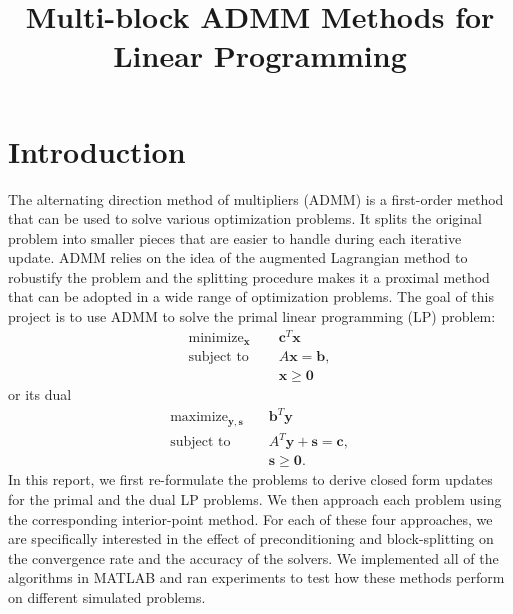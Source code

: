 \documentclass{article}
\title{Multi-block ADMM Methods for Linear Programming }
\author{\studentname}
\begin{document}
\maketitle
\vspace{0.1in}
\maketitle



\section{Introduction}
The alternating direction method of multipliers (ADMM) is a first-order method that can be used to solve various optimization problems. It splits the original problem into smaller pieces that are easier to handle during each iterative update. ADMM relies on the idea of the augmented Lagrangian method to robustify the problem and the splitting procedure makes it a proximal method that can be adopted in a wide range of optimization problems.
\newline
\newline
The goal of this project is to use ADMM to solve the primal linear programming  (LP) problem:
\begin{align}
\text{minimize}_{\mathbf{x}} &\quad \mathbf{c}^T\mathbf{x} \tag{OPT1}\label{OPT1} \\
\text{subject to } &\quad  A \mathbf{x} = \mathbf{b},  \nonumber \\
&\quad \mathbf{x} \geq \mathbf{0} \nonumber 
\end{align}
or its dual
\begin{align}
\text{maximize}_{\mathbf{y}, \mathbf{s}} &\quad \mathbf{b}^T\mathbf{y}  \tag{OPT2}\label{OPT2} \\
\text{subject to } &\quad  A^T \mathbf{y}  + \mathbf{s} = \mathbf{c},  \nonumber \\
&\quad \mathbf{s} \geq \mathbf{0} \nonumber.
\end{align}
In this report, we first re-formulate the problems to derive closed form updates for the primal and the dual LP problems. We then approach each problem using the corresponding interior-point method. For each of these four approaches, we are specifically interested in the effect of preconditioning and block-splitting on the convergence rate and the accuracy of the solvers. We implemented all of the algorithms in MATLAB and ran experiments to test how these methods perform on different simulated problems.
\end{document}
